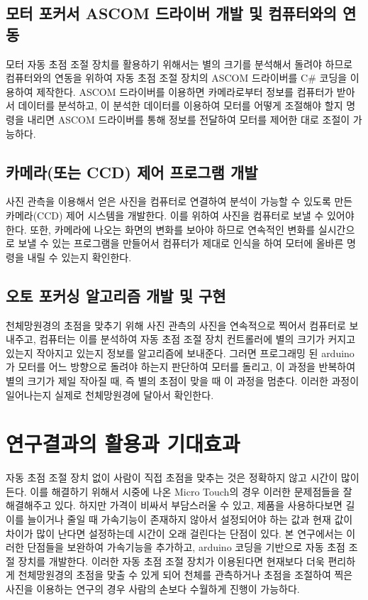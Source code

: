 \documentclass{abstract_hutech}
\begin{document}
\subsection{모터 포커서 ASCOM 드라이버 개발 및 컴퓨터와의 연동}

모터 자동 초점 조절 장치를 활용하기 위해서는 별의 크기를 분석해서 돌려야 하므로 컴퓨터와의 연동을 위하여 자동 초점 조절 장치의 ASCOM 드라이버를 C\# 코딩을 이용하여 제작한다. ASCOM 드라이버를 이용하면 카메라로부터 정보를 컴퓨터가 받아서 데이터를 분석하고, 이 분석한 데이터를 이용하여 모터를 어떻게 조절해야 할지 명령을 내리면 ASCOM 드라이버를 통해 정보를 전달하여 모터를 제어한 대로 조절이 가능하다.

\subsection{카메라(또는 CCD) 제어 프로그램 개발}

사진 관측을 이용해서 얻은 사진을 컴퓨터로 연결하여 분석이 가능할 수 있도록 만든 카메라(CCD) 제어 시스템을 개발한다. 이를 위하여 사진을 컴퓨터로 보낼 수 있어야 한다. 또한, 카메라에 나오는 화면의 변화를 보아야 하므로 연속적인 변화를 실시간으로 보낼 수 있는 프로그램을 만들어서 컴퓨터가 제대로 인식을 하여 모터에 올바른 명령을 내릴 수 있는지 확인한다.

\subsection{오토 포커싱 알고리즘 개발 및 구현}

천체망원경의 초점을 맞추기 위해 사진 관측의 사진을 연속적으로 찍어서 컴퓨터로 보내주고, 컴퓨터는 이를 분석하여 자동 초점 조절 장치 컨트롤러에 별의 크기가 커지고 있는지 작아지고 있는지 정보를 알고리즘에 보내준다. 그러면 프로그래밍 된 arduino가 모터를 어느 방향으로 돌려야 하는지 판단하여 모터를 돌리고, 이 과정을 반복하여 별의 크기가 제일 작아질 때, 즉 별의 초점이 맞을 때 이 과정을 멈춘다. 이러한 과정이 일어나는지 실제로 천체망원경에 달아서 확인한다.

\section{연구결과의 활용과 기대효과}

자동 초점 조절 장치 없이 사람이 직접 초점을 맞추는 것은 정확하지 않고 시간이 많이 든다. 이를 해결하기 위해서 시중에 나온 Micro Touch의 경우 이러한 문제점들을 잘 해결해주고 있다. 하지만 가격이 비싸서 부담스러울 수 있고, 제품을 사용하다보면 길이를 늘이거나 줄일 때 가속기능이 존재하지 않아서 설정되어야 하는 값과 현재 값이 차이가 많이 난다면 설정하는데 시간이 오래 걸린다는 단점이 있다. 본 연구에서는 이러한 단점들을 보완하여 가속기능을 추가하고, arduino 코딩을 기반으로 자동 초점 조절 장치를 개발한다. 이러한 자동 초점 조절 장치가 이용된다면 현재보다 더욱 편리하게 천체망원경의 초점을 맞출 수 있게 되어 천체를 관측하거나 초점을 조절하여 찍은 사진을 이용하는 연구의 경우 사람의 손보다 수월하게 진행이 가능하다.

\end{document}
